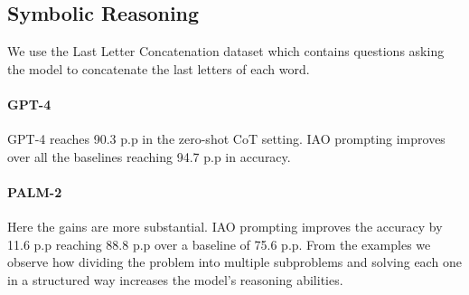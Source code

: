 \subsection{Symbolic Reasoning} We use the Last Letter Concatenation \cite{wei2022chain} dataset which contains questions asking the model to concatenate the last letters of each word. 
\paragraph{GPT-4} GPT-4 reaches 90.3 p.p in the zero-shot CoT setting. IAO prompting improves over all the baselines reaching 94.7 p.p in accuracy.  
\paragraph{PALM-2} Here the gains are more substantial. IAO prompting improves the accuracy by 11.6 p.p reaching 88.8 p.p over a baseline of 75.6 p.p. From the examples we observe how dividing the problem into multiple subproblems and solving each one in a structured way increases the model's reasoning abilities. 


\begin{comment}
\begin{table}[h]
\centering
\resizebox{\columnwidth}{!}{%
\begin{tabular}{@{}llllll@{}}
\toprule
Method     & \textbf{AQUA} & \textbf{GSM8k} & \textbf{SQA} & \textbf{CSQA} & \textbf{LL} \\ \midrule
\textbf{L2M} & 69.1          & 89.5 & 73.4 & 81.2 & 92.6 \\
\textbf{P\&S} & \textbf{73.1} & 91.7 & 75.1 & 83.7 & 94.1 \\
\textbf{IAO} & 70.2          & \textbf{94.2}  & \textbf{76.3}       & \textbf{84.8}          & \textbf{94.7}        \\ \bottomrule
\end{tabular}%
}
\caption{Accuracy comparison to L2M and P\&S in zero-shot setting using GPT-4.}
\label{tab:baseline_gpt4}
\end{table}
\vspace{-0.3cm}
\begin{table}[h]
\centering
\resizebox{\columnwidth}{!}{%
\begin{tabular}{@{}llllll@{}}
\toprule
Method     & \textbf{AQUA} & \textbf{GSM8k} & \textbf{SQA} & \textbf{CSQA} & \textbf{LL} \\ \midrule
\textbf{L2M}  & 57.4 & 77.5 & 61.5 & 71.9 & 83.2 \\
\textbf{P\&S} & 55.9 & 79.3 & 62.8 & 68.8 & 70.6 \\
\textbf{IAO} & \textbf{63.9} & \textbf{82.3}  & \textbf{76.9}       & \textbf{83.1}          & \textbf{88.8}        \\ \bottomrule
\end{tabular}%
}
\caption{Accuracy comparison to L2M and P\&S in zero-shot setting using PALM-2.}
\label{tab:baseline_palm}
\end{table}
\end{comment}

